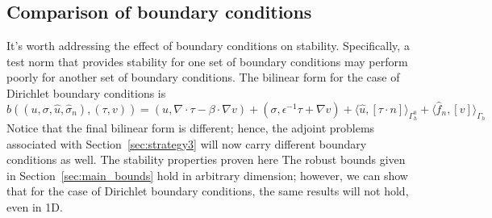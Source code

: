 \documentclass[11pt,onecolumn]{scrartcl}
\newcommand{\grad}{\nabla}
\renewcommand{\div}{\grad \cdot}
\begin{document}
\subsection{Comparison of boundary conditions}

It's worth addressing the effect of boundary conditions on stability.  Specifically, a test norm that provides stability for one set of boundary conditions may perform poorly for another set of boundary conditions.  The bilinear form for the case of Dirichlet boundary conditions is 
\[
b\left(\left(u,\sigma, \widehat{u}, \widehat{\sigma}_n\right), \left(\tau, v\right)\right) = \left(u,\div \tau - \beta \cdot \grad v\right) + \left(\sigma, \epsilon^{-1} \tau + \grad v\right) + \langle \widehat{u}, \left[\tau \cdot n\right] \rangle_{\Gamma_h^0} + \langle \widehat{f}_n, \left[v\right] \rangle_{\Gamma_h}
\]
Notice that the final bilinear form is different; hence, the adjoint problems associated with Section~\ref{sec:strategy3} will now carry different boundary conditions as well.  The stability properties proven here 
The robust bounds given in Section~\ref{sec:main_bounds} hold in arbitrary dimension; however, we can show that for the case of Dirichlet boundary conditions, the same results will not hold, even in 1D.  
\end{document}
